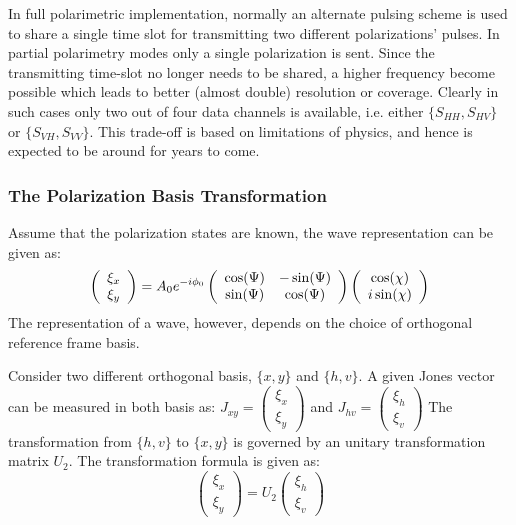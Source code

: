 In full polarimetric implementation, normally an alternate pulsing scheme is used to share a single time slot for transmitting two different polarizations' pulses.
In partial polarimetry modes only a single polarization is sent.
Since the transmitting time-slot no longer needs to be shared, a higher frequency become possible which leads to better (almost double) resolution or coverage.
Clearly in such cases only two out of four data channels is available, i.e. either $\{S_{HH},S_{HV}\}$ or $\{S_{VH},S_{VV}\}$.
This trade-off is based on limitations of physics, and hence is expected to be around for years to come.

\subsubsection{The Polarization Basis Transformation}

Assume that the polarization states are known, the wave representation can be given as:
\begin{equation}
\left( 
\begin{array}{c}
 \xi_x \\
 \xi_y
\end{array}
\right) 
= A_0 e^{-i \phi_0} \left(
\begin{array}{c c}
 \cos(\Psi) & -\sin(\Psi) \\
 \sin(\Psi) & \cos(\Psi)
\end{array}
\right) 
\left(
\begin{array}{c}
 \cos(\chi) \\
 i \sin(\chi)
\end{array}
\right) 
\end{equation}
The representation of a wave, however, depends on the choice of orthogonal reference frame basis.

Consider two different orthogonal basis, $\{ x,y \}$ and $\{ h,v \}$.
A given Jones vector can be measured in both basis as:
$J_{xy}= 
\left(
\begin{array}{c}
 \xi_x \\
 \xi_y
\end{array}
\right) $ and 
$J_{hv}
= \left(
\begin{array}{c}
 \xi_h \\
 \xi_v
\end{array}
\right)$
The transformation from $\{h,v\}$ to $\{x,y\}$ is governed by an unitary transformation matrix $U_2$.
The transformation formula is given as:
\begin{equation}
\left(
\begin{array}{c}
 \xi_x \\
 \xi_y
\end{array}
\right)
= U_2
\left(
\begin{array}{c}
 \xi_h \\
 \xi_v
\end{array}
\right)
\end{equation}

